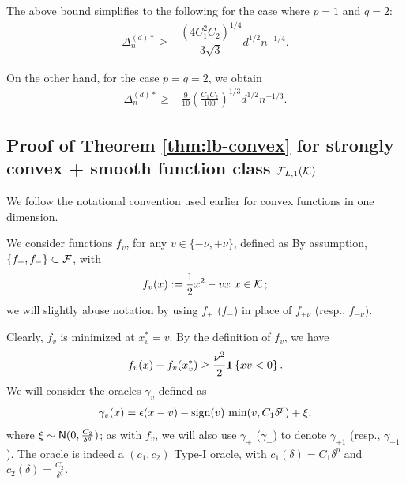 The above bound simplifies to the following for the case where $p=1$ and $q=2$:
\begin{align*}
\Delta_n^{(d)*}  \ge& \dfrac{ (4C_1^2C_2)^{1/4}}{3\sqrt{3}} d^{1/2}n^{-1/4}.
\end{align*}

On the other hand, for the case $p=q=2$, we obtain
\begin{align*}
\Delta_n^{(d)*}  \ge& \frac{9}{10}\left(\frac{C_1 C_2}{100}\right)^{1/3} d^{1/2}n^{-1/3}.
\end{align*}

\subsection{Proof of Theorem \ref{thm:lb-convex} for strongly convex + smooth function class $\mathcal{F}_{L,1}(\mathcal{K})$}
\label{sec:appendix-lbscconvex}
We follow the notational convention used earlier for convex functions in one dimension. 

We consider functions $f_v$, for any $v \in \{-\nu,+\nu\}$, defined as
By assumption,  $\{f_+, f_-\}\subset \mathcal{F}$, with 
\begin{align*}
  f_v(x) := \dfrac{1}{2} x^2 - v x \,\, x \in \mathcal{K}\,;
\end{align*}
we will slightly abuse notation by using $f_+$ ($f_-$) in place of $f_{+\nu}$ (resp., $f_{-\nu}$).

Clearly, $f_v$ is minimized at $x^*_v = v$.
By the definition of $f_v$, we have
\begin{align}
  f_v(x) - f_v(x^*_v)
\ge  \dfrac{\nu^2}{2}  \mathbf{1}\left\{x v  < 0\right\}. \label{eq:fv-lb-sc}
\end{align}
We will consider the oracles $\gamma_v$ defined as 
\begin{align}
 \gamma_v(x) = \epsilon(x-v) - \mathop{\rm sign}(v)\, \min(v,C_1 \delta^p) + \xi, \label{eq:oracle-1d}
\end{align}
where $\xi \sim \mathsf{N}(0,\frac{C_2}{\delta^q})$; as with $f_v$, we will also use $\gamma_{+}$ ($\gamma_-$) 
to denote $\gamma_{+1}$ (resp., $\gamma_{-1}$).
The oracle is indeed a $(c_1,c_2)$ Type-I oracle, with $c_1(\delta)=C_1\delta^p$ and $c_2(\delta)=\frac{C_2}{\delta^q}$.

